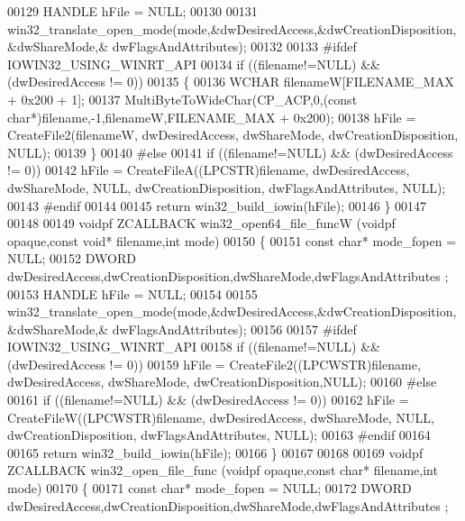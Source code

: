 \begin{DoxyCode}
00129     HANDLE hFile = NULL;
00130 
00131     win32\_translate\_open\_mode(mode,&dwDesiredAccess,&dwCreationDisposition,&dwShareMode,&
      dwFlagsAndAttributes);
00132 
00133 \textcolor{preprocessor}{#ifdef IOWIN32\_USING\_WINRT\_API}
00134     \textcolor{keywordflow}{if} ((filename!=NULL) && (dwDesiredAccess != 0))
00135     \{
00136         WCHAR filenameW[FILENAME\_MAX + 0x200 + 1];
00137         MultiByteToWideChar(CP\_ACP,0,(\textcolor{keyword}{const} \textcolor{keywordtype}{char}*)filename,-1,filenameW,FILENAME\_MAX + 0x200);
00138         hFile = CreateFile2(filenameW, dwDesiredAccess, dwShareMode, dwCreationDisposition, NULL);
00139     \}
00140 \textcolor{preprocessor}{#else}
00141     \textcolor{keywordflow}{if} ((filename!=NULL) && (dwDesiredAccess != 0))
00142         hFile = CreateFileA((LPCSTR)filename, dwDesiredAccess, dwShareMode, NULL, dwCreationDisposition, 
      dwFlagsAndAttributes, NULL);
00143 \textcolor{preprocessor}{#endif}
00144 
00145     \textcolor{keywordflow}{return} win32\_build\_iowin(hFile);
00146 \}
00147 
00148 
00149 voidpf ZCALLBACK win32\_open64\_file\_funcW (voidpf opaque,\textcolor{keyword}{const} \textcolor{keywordtype}{void}* filename,\textcolor{keywordtype}{int} mode)
00150 \{
00151     \textcolor{keyword}{const} \textcolor{keywordtype}{char}* mode\_fopen = NULL;
00152     DWORD dwDesiredAccess,dwCreationDisposition,dwShareMode,dwFlagsAndAttributes ;
00153     HANDLE hFile = NULL;
00154 
00155     win32\_translate\_open\_mode(mode,&dwDesiredAccess,&dwCreationDisposition,&dwShareMode,&
      dwFlagsAndAttributes);
00156 
00157 \textcolor{preprocessor}{#ifdef IOWIN32\_USING\_WINRT\_API}
00158     \textcolor{keywordflow}{if} ((filename!=NULL) && (dwDesiredAccess != 0))
00159         hFile = CreateFile2((LPCWSTR)filename, dwDesiredAccess, dwShareMode, dwCreationDisposition,NULL);
00160 \textcolor{preprocessor}{#else}
00161     \textcolor{keywordflow}{if} ((filename!=NULL) && (dwDesiredAccess != 0))
00162         hFile = CreateFileW((LPCWSTR)filename, dwDesiredAccess, dwShareMode, NULL, dwCreationDisposition, 
      dwFlagsAndAttributes, NULL);
00163 \textcolor{preprocessor}{#endif}
00164 
00165     \textcolor{keywordflow}{return} win32\_build\_iowin(hFile);
00166 \}
00167 
00168 
00169 voidpf ZCALLBACK win32\_open\_file\_func (voidpf opaque,\textcolor{keyword}{const} \textcolor{keywordtype}{char}* filename,\textcolor{keywordtype}{int} mode)
00170 \{
00171     \textcolor{keyword}{const} \textcolor{keywordtype}{char}* mode\_fopen = NULL;
00172     DWORD dwDesiredAccess,dwCreationDisposition,dwShareMode,dwFlagsAndAttributes ;

\end{DoxyCode}
